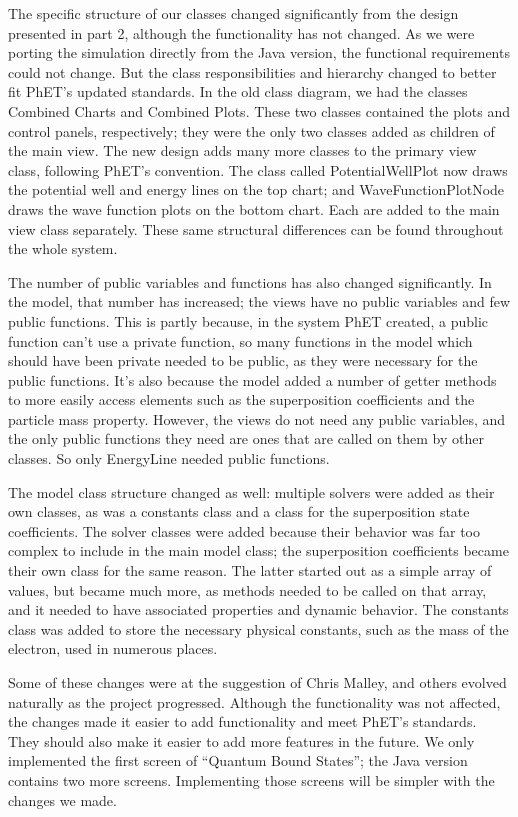 The specific structure of our classes changed significantly from the design presented in part 2,
although the functionality has not changed.  As we were porting the simulation directly from the
Java version, the functional requirements could not change.  But the class responsibilities and
hierarchy changed to better fit PhET's updated standards.  In the old class diagram, we had the
classes {\ttfamily Combined Charts} and {\ttfamily Combined Plots}. These two classes contained the
plots and control panels, respectively; they were the only two classes added as children of the main
view. The new design adds many more classes to the primary view class, following PhET's convention.
The class called {\ttfamily PotentialWellPlot} now draws the potential well and energy lines on the
top chart; and {\ttfamily WaveFunctionPlotNode} draws the wave function plots on the bottom chart.
Each are added to the main view class separately.  These same structural differences can be found
throughout the whole system.

The number of public variables and functions has also changed significantly.  In the model, that
number has increased; the views have no public variables and few public functions.  This is partly
because, in the system PhET created, a public function can't use a private function, so many
functions in the model which should have been private needed to be public, as they were necessary
for the public functions.  It's also because the model added a number of getter methods to more
easily access elements such as the superposition coefficients and the particle mass property.
However, the views do not need any public variables, and the only public functions they need are
ones that are called on them by other classes.  So only {\ttfamily EnergyLine} needed public
functions.

The model class structure changed as well: multiple solvers were added as their own classes, as
was a constants class and a class for the superposition state coefficients.  The solver classes
were added because their behavior was far too complex to include in the main model class; the
superposition coefficients became their own class for the same reason.  The latter started out
as a simple array of values, but became much more, as methods needed to be called on that
array, and it needed to have associated properties and dynamic behavior.  The constants class
was added to store the necessary physical constants, such as the mass of the electron, used in
numerous places.

Some of these changes were at the suggestion of Chris Malley, and others evolved naturally as
the project progressed.  Although the functionality was not affected, the changes made it
easier to add functionality and meet PhET's standards.  They should also make it easier to add
more features in the future.  We only implemented the first screen of ``Quantum Bound States''; the
Java version contains two more screens.  Implementing those screens will be simpler with the changes
we made.

